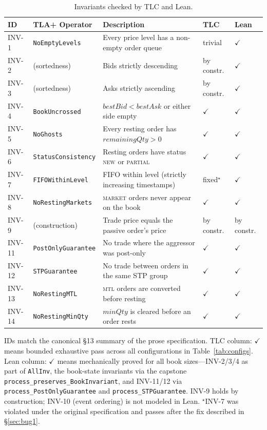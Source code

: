 \documentclass[11pt,a4paper]{article}
\begin{document}
\begin{table}[H]
\centering
\caption{Invariants checked by TLC and Lean.}
\label{tab:invariants}
\small
\begin{tabular}{@{}llL{4.8cm}ll@{}}
\toprule
ID & TLA+ Operator & Description & TLC & Lean \\
\midrule
INV-1  & \texttt{NoEmptyLevels}    & Every price level has a non-empty order queue & trivial & $\checkmark$ \\
INV-2  & (sortedness)              & Bids strictly descending & by constr. & $\checkmark$ \\
INV-3  & (sortedness)              & Asks strictly ascending & by constr. & $\checkmark$ \\
INV-4  & \texttt{BookUncrossed}    & $\mathit{bestBid} < \mathit{bestAsk}$ or either side empty & $\checkmark$ & $\checkmark$ \\
INV-5  & \texttt{NoGhosts}         & Every resting order has $\mathit{remainingQty} > 0$ & $\checkmark$ & $\checkmark$ \\
INV-6  & \texttt{StatusConsistency}& Resting orders have status \textsc{new} or \textsc{partial} & $\checkmark$ & $\checkmark$ \\
INV-7  & \texttt{FIFOWithinLevel}  & FIFO within level (strictly increasing timestamps) & fixed$^{\star}$ & $\checkmark$ \\
INV-8  & \texttt{NoRestingMarkets} & \textsc{market} orders never appear on the book & $\checkmark$ & $\checkmark$ \\
INV-9  & (construction)            & Trade price equals the passive order's price & by constr. & by constr. \\
INV-11 & \texttt{PostOnlyGuarantee}& No trade where the aggressor was post-only & $\checkmark$ & $\checkmark$ \\
INV-12 & \texttt{STPGuarantee}     & No trade between orders in the same STP group & $\checkmark$ & $\checkmark$ \\
INV-13 & \texttt{NoRestingMTL}     & \textsc{mtl} orders are converted before resting & $\checkmark$ & $\checkmark$ \\
INV-14 & \texttt{NoRestingMinQty}  & $\mathit{minQty}$ is cleared before an order rests & $\checkmark$ & $\checkmark$ \\
\bottomrule
\end{tabular}

\medskip
\raggedright\footnotesize
IDs match the canonical \S13 summary of the prose specification.
TLC column: $\checkmark$ means bounded exhaustive pass across all
configurations in Table~\ref{tab:configs}. Lean column:
$\checkmark$ means mechanically proved for all book sizes---INV-2/3/4
as part of \texttt{AllInv}, the book-state invariants via the capstone
\texttt{process\_preserves\_BookInvariant}, and INV-11/12 via
\texttt{process\_PostOnlyGuarantee} and \texttt{process\_STPGuarantee}.
INV-9 holds by construction; INV-10 (event ordering) is not modeled in
Lean.
$^{\star}$INV-7 was violated under the original specification and
passes after the fix described in \S\ref{sec:bug1}.
\end{table}
\end{document}

